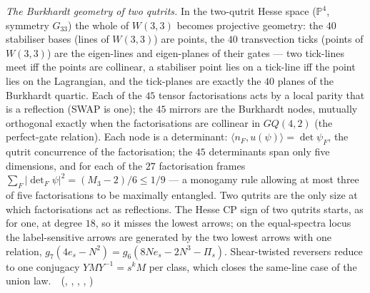 \emph{The Burkhardt geometry of two qutrits.} In the two-qutrit Hesse space ($\mathbb P^4$, symmetry $G_{33}$) the whole of $W(3,3)$ becomes
projective geometry: the $40$ stabiliser bases (lines of $W(3,3)$) are points, the $40$ transvection ticks (points of $W(3,3)$) are the
eigen-lines and eigen-planes of their gates --- two tick-lines meet iff the points are collinear, a stabiliser point lies on a tick-line
iff the point lies on the Lagrangian, and the tick-planes are exactly the $40$ planes of the Burkhardt quartic. Each of the $45$ tensor
factorisations acts by a local parity that is a reflection (SWAP is one); the $45$ mirrors are the Burkhardt nodes, mutually orthogonal
exactly when the factorisations are collinear in $GQ(4,2)$ (the perfect-gate relation). Each node is a determinant:
$\langle n_F,u(\psi)\rangle=\det\psi_F$, the qutrit concurrence of the factorisation; the $45$ determinants span only five dimensions, and
for each of the $27$ factorisation frames $\sum_{F}|\det_F\psi|^2=(M_3-2)/6\le1/9$ --- a monogamy rule allowing at most three of five
factorisations to be maximally entangled. Two qutrits are the only size at which factorisations act as reflections. The Hesse CP sign of two
qutrits starts, as for one, at degree $18$, so it misses the lowest arrows; on the equal-spectra locus the label-sensitive arrows are
generated by the two lowest arrows with one relation, $g_7(4e_s-N^2)=g_6(8Ne_s-2N^3-\Pi_s)$. Shear-twisted reversers reduce to one
conjugacy $YMY^{-1}=s^kM$ per class, which closes the same-line case of the union law.
\tierT\,\tierC\ (, ,
, ,
)

